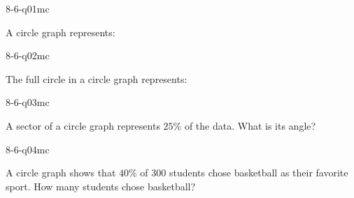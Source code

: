 

\begin{practiceQuestion}{8-6-q01}{mc}
\begin{questionText}
A circle graph represents:
\end{questionText}
\end{practiceQuestion}

\begin{practiceQuestion}{8-6-q02}{mc}
\begin{questionText}
The full circle in a circle graph represents:
\end{questionText}
\end{practiceQuestion}

\begin{practiceQuestion}{8-6-q03}{mc}
\begin{questionText}
A sector of a circle graph represents $25\%$ of the data. What is its angle?
\end{questionText}
\end{practiceQuestion}

\begin{practiceQuestion}{8-6-q04}{mc}
\begin{questionText}
A circle graph shows that $40\%$ of $300$ students chose basketball as their favorite sport. How many students chose basketball?
\end{questionText}
\end{practiceQuestion}


